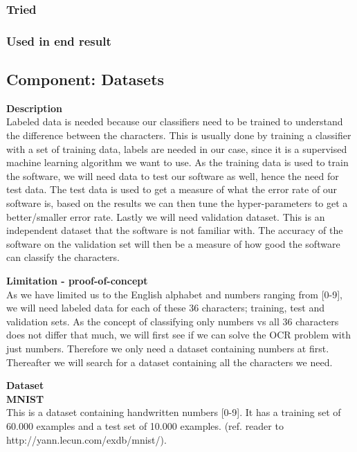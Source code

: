 \documentclass[11pt,a4paper,UKenglish]{article}
\begin{document}
\subsubsection{Tried}
\subsubsection{Used in end result}

\subsection{Component: Datasets}
\label{Method:Datasets}

\begin{flushleft}
  \textbf{Description} \\
  Labeled data is needed because our classifiers need to be trained to understand
  the difference between the characters. This is usually done by training a
  classifier with a set of training data, labels are needed in our case,
  since it is a supervised machine learning algorithm we want to use. As the
  training data is used to train the software, we will need data to test our
  software as well, hence the need for test data. The test data is used to get a
  measure of what the error rate of our software is, based on the results we
  can then tune the hyper-parameters to get a better/smaller error rate. Lastly
  we will need validation dataset. This is an independent dataset that the software
  is not familiar with. The accuracy of the software on the validation set will
  then be a measure of how good the software can classify the characters.
\end{flushleft}

\begin{flushleft}
  \textbf{Limitation - proof-of-concept} \\
  As we have limited us to the English alphabet and numbers ranging from [0-9],
  we will need labeled data for each of these 36 characters; training, test and
  validation sets. As the concept of classifying only numbers vs all 36
  characters does not differ that much, we will first see if we can solve the OCR
  problem with just numbers. Therefore we only need a dataset containing numbers
  at first. Thereafter we will search for a dataset containing all the characters
  we need.
\end{flushleft}

\begin{flushleft}
  \textbf{Dataset} \\
  \textbf{MNIST} \\
  This is a dataset containing handwritten numbers [0-9].
  It has a training set of 60.000 examples and a test set of 10.000 examples.
  (ref. reader to http://yann.lecun.com/exdb/mnist/).
\end{flushleft}
\end{document}
